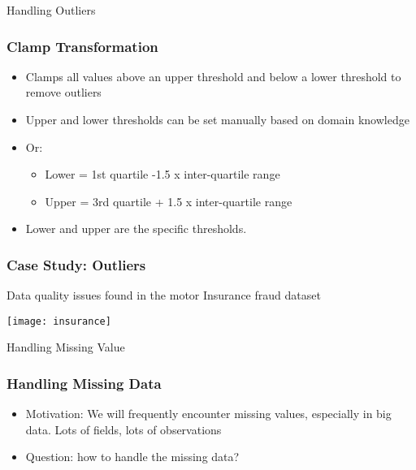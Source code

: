 \begin{frame}
  \begin{center}
    {\Large Handling Outliers}
  \end{center}
\end{frame}



\begin{frame}[fragile]\frametitle{Clamp Transformation}	
\begin{itemize}
\item Clamps all values above an upper threshold and below a lower threshold to remove outliers
\item Upper and lower thresholds can be set manually based on domain knowledge
\item Or:
\begin{itemize}
\item Lower = 1st quartile -1.5 x inter-quartile range
\item Upper = 3rd quartile + 1.5 x inter-quartile range
\end{itemize}
\item Lower and upper are the specific thresholds.
\end{itemize}
\end{frame}

\begin{frame}[fragile]\frametitle{Case Study: Outliers}	
Data quality issues found in the motor Insurance fraud dataset
\begin{center}
\texttt{[image: insurance]}
\end{center}
\end{frame}

\begin{frame}
  \begin{center}
    {\Large Handling Missing Value}
  \end{center}
\end{frame}



\begin{frame}[fragile]\frametitle{Handling Missing Data}	
	\begin{itemize}
	\item Motivation: We will frequently encounter missing values, especially in big data. Lots of fields, lots of observations
	\item Question: how to handle the missing data?
	\end{itemize}

\end{frame}

